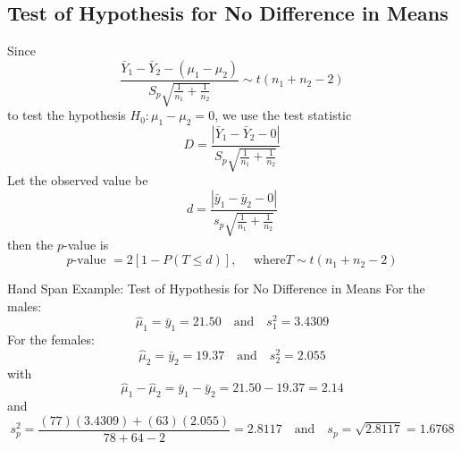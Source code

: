 \subsection{Test of Hypothesis for No Difference in Means}
Since
\[\frac{\bar{Y}_{1}-\bar{Y}_{2}-\left(\mu_{1}-\mu_{2}\right)}{S_{p} \sqrt{\frac{1}{n_{1}}+\frac{1}{n_{2}}}} \sim t\left(n_{1}+n_{2}-2\right)\]
to test the hypothesis $ H_0:\mu_1-\mu_2=0 $,
we use the test statistic
\[D=\frac{\left|\bar{Y}_{1}-\bar{Y}_{2}-0\right|}{S_{p} \sqrt{\frac{1}{n_{1}}+\frac{1}{n_{2}}}}\]
Let the observed value be
\[d=\frac{\left|\bar{y}_{1}-\bar{y}_{2}-0\right|}{s_{p} \sqrt{\frac{1}{n_{1}}+\frac{1}{n_{2}}}}\]
then the $ p $-value is
\[p \text{-value }=2[1-P(T \leq d)], \quad \text{ where} T \sim t\left(n_{1}+n_{2}-2\right)\]

\begin{Example}{Hand Span Example: Test of Hypothesis for No Difference in Means}{}
    For the males:
    \[\hat{\mu}_{1}=\bar{y}_{1}=21.50 \quad \text{and} \quad s_{1}^{2}=3.4309\]
    For the females:
    \[\hat{\mu}_{2}=\bar{y}_{2}=19.37 \quad \text{and} \quad s_{2}^{2}=2.055\]
    with
    \[\hat{\mu}_{1}-\hat{\mu}_{2}=\bar{y}_{1}-\bar{y}_{2}=21.50-19.37=2.14\]
    and
    \[s_{p}^{2}=\frac{(77)(3.4309)+(63)(2.055)}{78+64-2}=2.8117 \quad \text{and} \quad s_{p}=\sqrt{2.8117}=1.6768\]

\end{Example}



